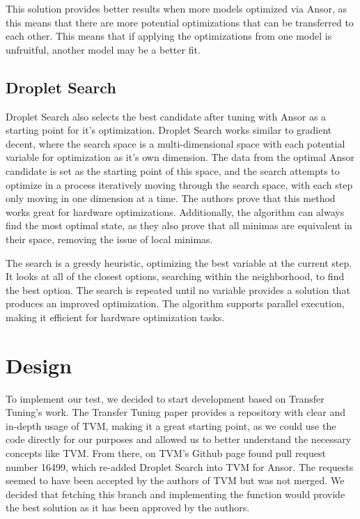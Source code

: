\documentclass[conference]{IEEEtran}
\begin{document}
This solution provides better results when more models optimized via Ansor, as this means that there are more potential optimizations that can be transferred to each other. This means that if applying the optimizations from one model is unfruitful, another model may be a better fit. 

\subsection{Droplet Search}
Droplet Search also selects the best candidate after tuning with Ansor as a starting point for it's optimization. Droplet Search works similar to gradient decent, where the search space is a multi-dimensional space with each potential variable for optimization as it's own dimension. The data from the optimal Ansor candidate is set as the starting point of this space, and the search attempts to optimize in a process iteratively moving through the search space, with each step only moving in one dimension at a time. The authors prove that this method works great for hardware optimizations. Additionally, the algorithm can always find the most optimal state, as they also prove that all minimas are equivalent in their space, removing the issue of local minimas. 

The search is a greedy heuristic, optimizing the best variable at the current step. It looks at all of the closest options, searching within the neighborhood, to find the best option. The search is repeated until no variable provides a solution that produces an improved optimization. The algorithm supports parallel execution, making it efficient for hardware optimization tasks.

\section{Design}
To implement our test, we decided to start development based on Transfer Tuning's work. The Transfer Tuning paper provides a repository with clear and in-depth usage of TVM, making it a great starting point, as we could use the code directly for our purposes and allowed us to better understand the necessary concepts like TVM. From there, on TVM's Github page found pull request number 16499, which re-added Droplet Search into TVM for Ansor. The requests seemed to have been accepted by the authors of TVM but was not merged. We decided that fetching this branch and implementing the function would provide the best solution as it has been approved by the authors.
\end{document}
